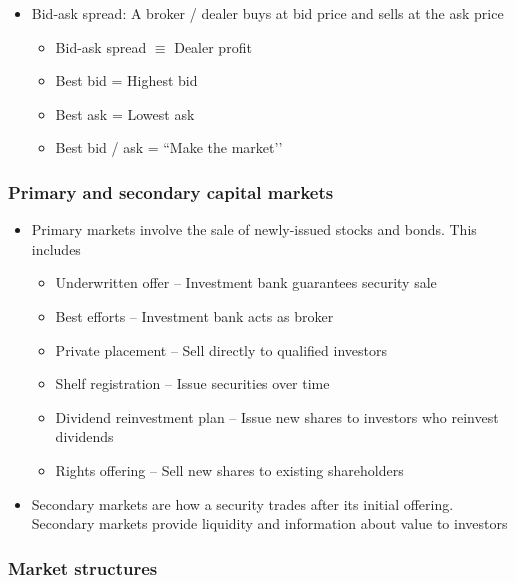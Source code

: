 \documentclass[../notes_compiled.tex]{subfiles}
\begin{document}
\begin{itemize}
\begin{itemize}
\item Bid-ask spread: A broker / dealer buys at bid price and sells at the ask price
\begin{itemize}
\item Bid-ask spread $\equiv$ Dealer profit
\item Best bid = Highest bid
\item Best ask = Lowest ask
\item Best bid / ask = ``Make the market’’
\end{itemize}

\end{itemize}


\end{itemize}


\subsubsection{Primary and secondary capital markets}

\begin{itemize}
\item Primary markets involve the sale of newly-issued stocks and bonds. This includes
\begin{itemize}
\item Underwritten offer -- Investment bank guarantees security sale
\item Best efforts -- Investment bank acts as broker
\item Private placement -- Sell directly to qualified investors
\item Shelf registration -- Issue securities over time 
\item Dividend reinvestment plan -- Issue new shares to investors who reinvest dividends
\item Rights offering -- Sell new shares to existing shareholders
\end{itemize}

\item Secondary markets are how a security trades after its initial offering. Secondary markets provide liquidity and information about value to investors


\end{itemize}



\subsubsection{Market structures}
\end{document}
